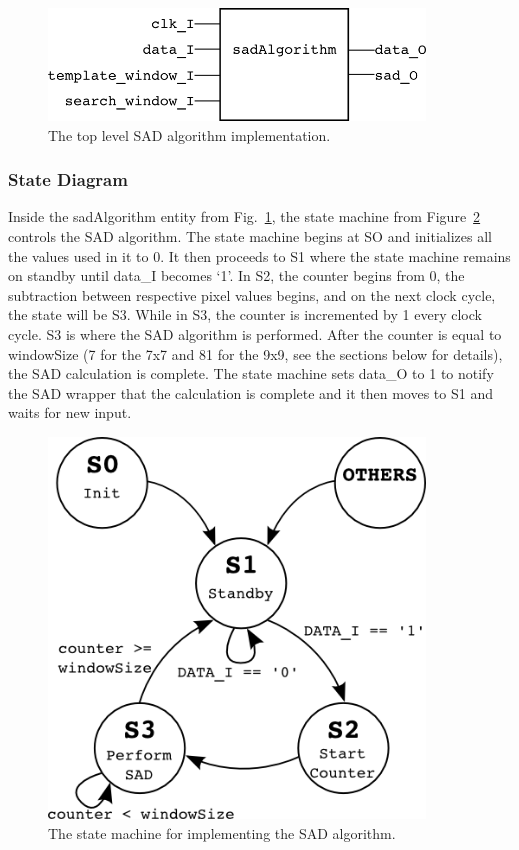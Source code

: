 \begin{figure}[h]
	\begin{center}
		\includegraphics[width=100mm]{figures/sadAlgorithm_rtl.png}
		\captionfonts
		\caption{The top level SAD algorithm implementation.}
		\label{fig:sadAlg_rtl}
	\end{center}
\end{figure}

\subsubsection{State Diagram}

Inside the sadAlgorithm entity from Fig.~\ref{fig:sadAlg_rtl}, the state machine from Figure~\ref{fig:stateMachine} controls the SAD algorithm. The state machine begins at SO and initializes all the values used in it to 0. It then proceeds to S1 where the state machine remains on standby until data\_I becomes `1'. In S2, the counter begins from 0, the subtraction between respective pixel values begins, and on the next clock cycle, the state will be S3. While in S3, the counter is incremented by 1 every clock cycle. S3 is where the SAD algorithm is performed. After the counter is equal to windowSize (7 for the 7x7 and 81 for the 9x9, see the sections below for details), the SAD calculation is complete. The state machine sets data\_O to 1 to notify the SAD wrapper that the calculation is complete and it then moves to S1 and waits for new input.

\begin{figure}[h]
	\begin{center}
		\includegraphics[width=100mm]{figures/stateMachine.png}
		\captionfonts
		\caption{The state machine for implementing the SAD algorithm.}
		\label{fig:stateMachine}
	\end{center}
\end{figure}

